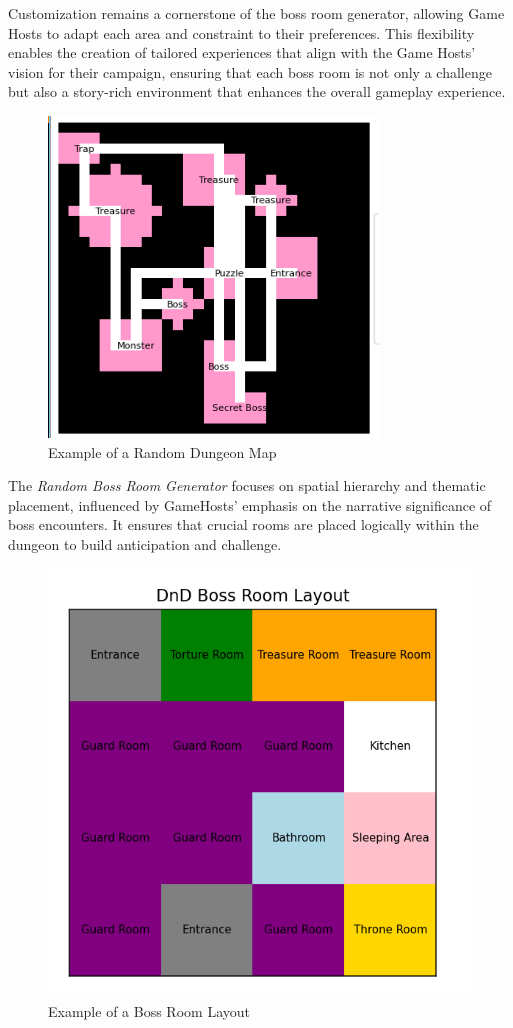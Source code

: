 \documentclass[10pt,twocolumn]{article}
\begin{document}
Customization remains a cornerstone of the boss room generator, allowing Game Hosts to adapt each area and constraint to their preferences. This flexibility enables the creation of tailored experiences that align with the Game Hosts' vision for their campaign, ensuring that each boss room is not only a challenge but also a story-rich environment that enhances the overall gameplay experience.

\begin{figure}[h]
\centering
\includegraphics[width=0.5\linewidth]{mymap.png}
\caption{Example of a Random Dungeon Map}
\label{fig:dungeon-map}
\end{figure}

The \textit{Random Boss Room Generator} focuses on spatial hierarchy and thematic placement, influenced by GameHosts' emphasis on the narrative significance of boss encounters. It ensures that crucial rooms are placed logically within the dungeon to build anticipation and challenge.

\begin{figure}[h]
\centering
\includegraphics[width=0.5\linewidth]{bossmap.png}
\caption{Example of a Boss Room Layout}
\label{fig:boss-room}
\end{figure}
\end{document}
